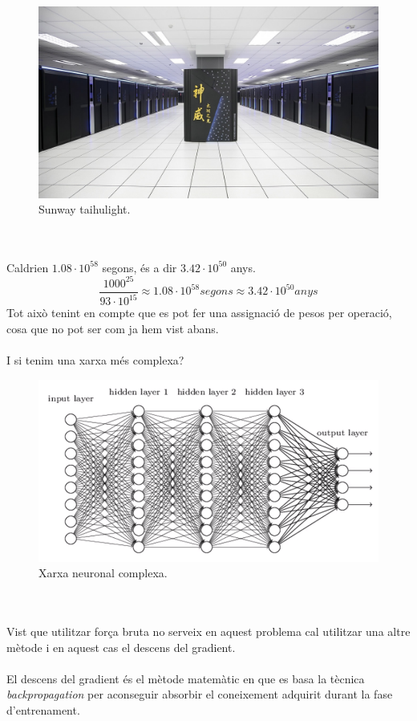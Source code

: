 \documentclass[12pt]{article}
\begin{document}
\pagebreak
\begin{figure}[h!]
	\centering
	\includegraphics[scale=0.3]{imatges/dg/sunlight.jpg}
	\caption{Sunway taihulight.}
\end{figure}
\\\\Caldrien $1.08 \cdot 10^{58}$ segons, és a dir $3.42 \cdot 10^{50}$ anys. 
$$\frac{1000^{25}}{93 \cdot 10^{15}} \approx 1.08 \cdot 10^{58} segons \approx 3.42 \cdot 10^{50} anys$$ 
Tot això tenint en compte que es pot fer una assignació de pesos per operació, cosa que no pot ser com ja hem vist abans. 
\\\\I si tenim una xarxa més complexa?
\begin{figure}[h!]
	\centering
	\includegraphics[scale=0.25]{imatges/dg/xnComplexa.png}
	\caption{Xarxa neuronal complexa.}
\end{figure}
\\\\Vist que utilitzar força bruta no serveix en aquest problema cal utilitzar una altre mètode i en aquest cas el descens del gradient.
\\\\El descens del gradient és el mètode matemàtic en que es basa la tècnica \textit{backpropagation} per aconseguir absorbir el coneixement adquirit durant la fase d'entrenament. 
\end{document}
